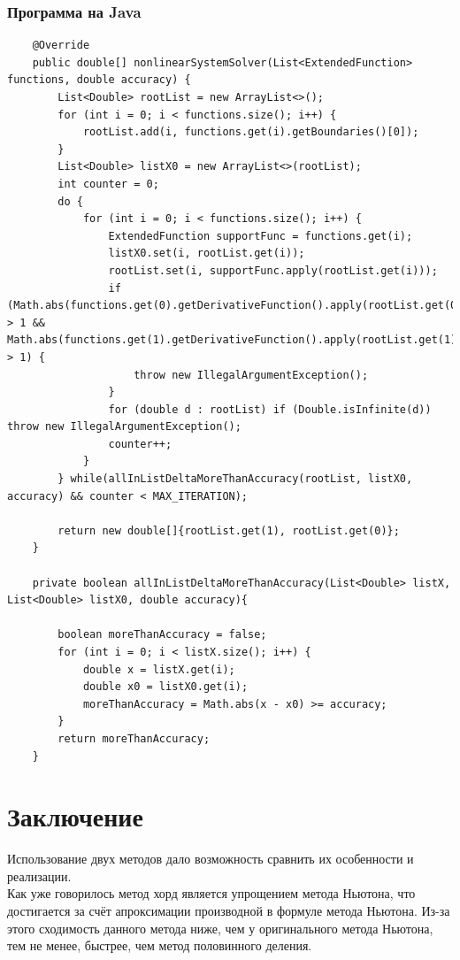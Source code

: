 \documentclass[11pt, english]{article}
\begin{document}
\subsubsection{Программа на Java}
\begin{center}
    \begin{lstlisting}
    @Override
    public double[] nonlinearSystemSolver(List<ExtendedFunction> functions, double accuracy) {
        List<Double> rootList = new ArrayList<>();
        for (int i = 0; i < functions.size(); i++) {
            rootList.add(i, functions.get(i).getBoundaries()[0]);
        }
        List<Double> listX0 = new ArrayList<>(rootList);
        int counter = 0;
        do {
            for (int i = 0; i < functions.size(); i++) {
                ExtendedFunction supportFunc = functions.get(i);
                listX0.set(i, rootList.get(i));
                rootList.set(i, supportFunc.apply(rootList.get(i)));
                if (Math.abs(functions.get(0).getDerivativeFunction().apply(rootList.get(0))) > 1 && Math.abs(functions.get(1).getDerivativeFunction().apply(rootList.get(1))) > 1) {
                    throw new IllegalArgumentException();
                }
                for (double d : rootList) if (Double.isInfinite(d)) throw new IllegalArgumentException();
                counter++;
            }
        } while(allInListDeltaMoreThanAccuracy(rootList, listX0, accuracy) && counter < MAX_ITERATION);

        return new double[]{rootList.get(1), rootList.get(0)};
    }

    private boolean allInListDeltaMoreThanAccuracy(List<Double> listX, List<Double> listX0, double accuracy){

        boolean moreThanAccuracy = false;
        for (int i = 0; i < listX.size(); i++) {
            double x = listX.get(i);
            double x0 = listX0.get(i);
            moreThanAccuracy = Math.abs(x - x0) >= accuracy;
        }
        return moreThanAccuracy;
    }
    \end{lstlisting}
\end{center}
\section{Заключение}
Использование двух методов дало возможность сравнить их особенности и реализации. \\

Как уже говорилось метод хорд является упрощением метода Ньютона, что достигается за счёт апроксимации производной в формуле метода Ньютона. Из-за этого сходимость данного метода ниже, чем у оригинального метода Ньютона, тем не менее, быстрее, чем метод половинного деления. \\
\end{document}
